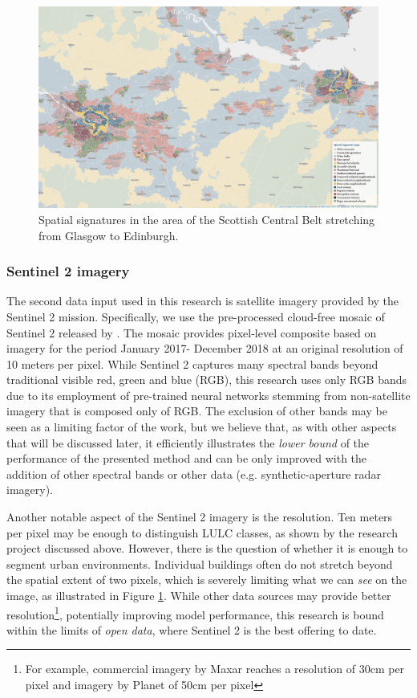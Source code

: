 \documentclass[]{interact}
\theoremstyle{plain}%
\theoremstyle{definition}
\theoremstyle{remark}
\begin{document}
\begin{figure}
    \centering
    \includegraphics[width=.8\linewidth]{fig/signatures_scotland.png}
    \caption{Spatial signatures in the area of the Scottish Central Belt stretching from Glasgow to Edinburgh.}
    \label{fig:signatures}
\end{figure}



\subsubsection{Sentinel 2 imagery}


The second data input used in this research is satellite imagery provided by the
Sentinel 2 mission. Specifically, we use the pre-processed cloud-free mosaic of Sentinel
2 released by \cite{CORBANE2020105737}.
The mosaic provides pixel-level composite based on imagery for the period January 2017-
December 2018 at an original resolution of 10 meters per pixel. While Sentinel 2
captures many spectral bands beyond traditional visible red, green and blue (RGB), this
research uses only RGB bands due to its employment of pre-trained neural networks
stemming from non-satellite imagery that is composed only of RGB. The exclusion of other
bands may be seen as a limiting factor of the work, but we believe that, as with other
aspects that will be discussed later, it efficiently illustrates the \textit{lower
bound} of the performance of the presented method and can be only improved with the addition of
other spectral bands or other data (e.g. synthetic-aperture radar imagery).

Another notable aspect of the Sentinel 2 imagery is the resolution. Ten meters per pixel
may be enough to distinguish LULC classes, as shown by the research project discussed
above. However, there is the question of whether it is enough to segment urban
environments. Individual buildings often do not stretch beyond the spatial extent of two
pixels, which is severely limiting what we can \textit{see} on the image, as illustrated
in Figure \ref{fig:signatures}. While other data sources may provide better
resolution\footnote{For example, commercial imagery by Maxar reaches a resolution of
30cm per pixel and imagery by Planet of 50cm per pixel}, potentially improving model
performance, this research is bound within the limits of \textit{open data}, where
Sentinel 2 is the best offering to date.
\end{document}
